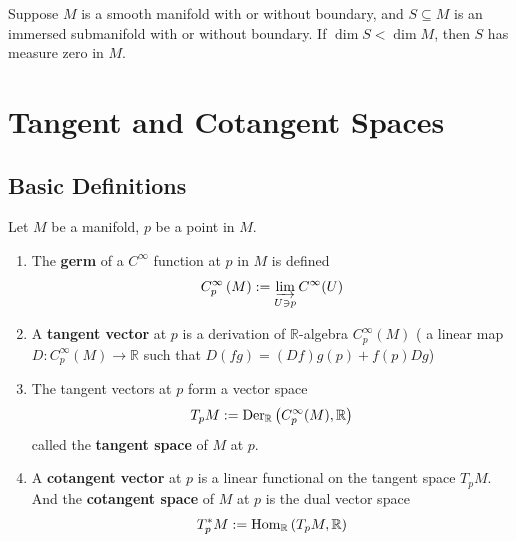 \documentclass[12pt, oneside]{book}
\begin{document}
\begin{corollary}
    Suppose $M$ is a smooth manifold with or without boundary, and $S \subseteq M$ is an immersed submanifold with or without boundary. If $\operatorname{dim} S<\operatorname{dim} M$, then $S$ has measure zero in $M$.
\end{corollary}







\chapter{Tangent and Cotangent Spaces}

\section{Basic Definitions}
\begin{definition}
    Let $M$ be a manifold, $p$ be a point in $M$.
    \begin{enumerate}
        \item
              The \textbf{germ} of a $C^\infty$ function at $p$ in $M$ is defined
              \begin{equation*}
                  C^\infty_p\left(M\right)
                  :=
                  \varinjlim_{U \ni p} C^{\infty}(U)
              \end{equation*}
        \item
              A \textbf{tangent vector} at $p$ is  a derivation of $\mathbb{R}$-algebra $ C^\infty_p\left(M\right)$
              ( a linear map $D: C_p^{\infty}(M) \rightarrow \mathbb{R}$ such that  $D(f g)=(D f) g(p)+f(p) D g$)
        \item
              The tangent vectors at $p$ form a vector space
              \begin{equation*}
                  T_pM
                  :=
                  \operatorname{Der}_{\mathbb{R}} \left(C_p^{\infty}(M), \mathbb{R}\right)
              \end{equation*}
              called the \textbf{tangent space} of $M$ at $p$.
        \item
              A \textbf{cotangent vector} at $p$ is a linear functional on the tangent space $T_p M$.
              And the \textbf{cotangent space} of $M$ at $p$ is the dual vector space
              \begin{equation*}
                  T_p^* M
                  :=
                  \operatorname{\operatorname{Hom}}_{\mathbb{R}}\left(T_p M, \mathbb{R}\right)
              \end{equation*}
    \end{enumerate}
\end{definition}
\end{document}
